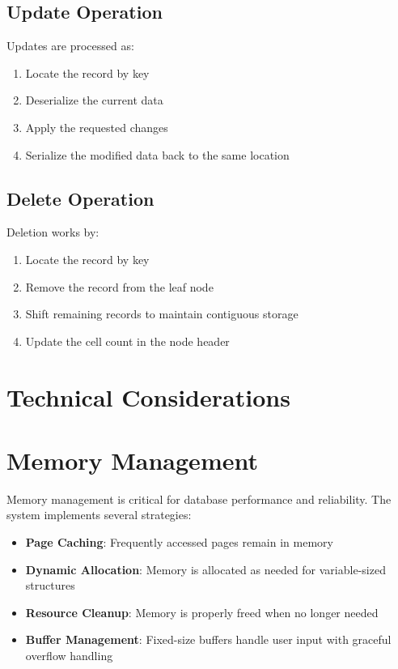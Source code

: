 \documentclass[12pt,a4paper]{article}  %
\begin{document}
\subsection{Update Operation}
Updates are processed as:

\begin{enumerate}
    \item Locate the record by key
    \item Deserialize the current data
    \item Apply the requested changes
    \item Serialize the modified data back to the same location
\end{enumerate}

\subsection{Delete Operation}
Deletion works by:

\begin{enumerate}
    \item Locate the record by key
    \item Remove the record from the leaf node
    \item Shift remaining records to maintain contiguous storage
    \item Update the cell count in the node header
\end{enumerate}

\section{Technical Considerations}

\section{Memory Management}

Memory management is critical for database performance and reliability. The system implements several strategies:

\begin{itemize}
    \item \textbf{Page Caching}: Frequently accessed pages remain in memory
    \item \textbf{Dynamic Allocation}: Memory is allocated as needed for variable-sized structures
    \item \textbf{Resource Cleanup}: Memory is properly freed when no longer needed
    \item \textbf{Buffer Management}: Fixed-size buffers handle user input with graceful overflow handling
\end{itemize}
\end{document}
